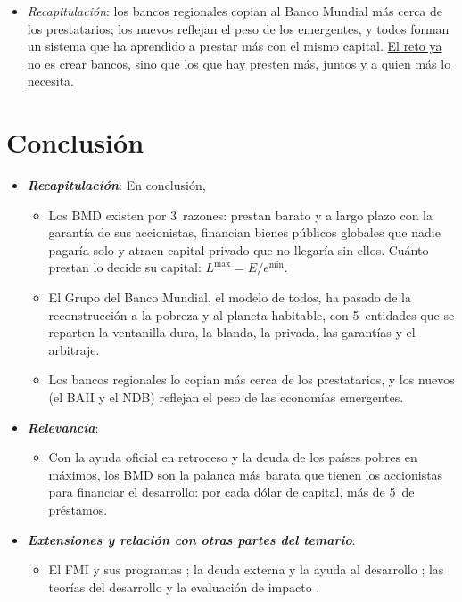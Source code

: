 \documentclass[11pt]{article}
\begin{document}
\begin{itemize}
\item \emph{Recapitulación}: los bancos regionales copian al Banco Mundial más cerca de los prestatarios; los nuevos reflejan el peso de los emergentes, y todos forman un sistema que ha aprendido a prestar más con el mismo capital. \uline{El reto ya no es crear bancos, sino que los que hay presten más, juntos y a quien más lo necesita.}
\end{itemize}

\section*{Conclusión}

\begin{itemize}
\item \textbf{\emph{Recapitulación}}: En conclusión,
  \begin{itemize}
  \item Los BMD existen por 3~razones: prestan barato y a largo plazo con la garantía de sus accionistas, financian bienes públicos globales que nadie pagaría solo y atraen capital privado que no llegaría sin ellos. Cuánto prestan lo decide su capital: $L^{\max}=E/e^{\min}$.
  \item El Grupo del Banco Mundial, el modelo de todos, ha pasado de la reconstrucción a la pobreza y al planeta habitable, con 5~entidades que se reparten la ventanilla dura, la blanda, la privada, las garantías y el arbitraje.
  \item Los bancos regionales lo copian más cerca de los prestatarios, y los nuevos (el BAII y el NDB) reflejan el peso de las economías emergentes.
  \end{itemize}
\item \textbf{\emph{Relevancia}}:
  \begin{itemize}
  \item Con la ayuda oficial en retroceso y la deuda de los países pobres en máximos, los BMD son la palanca más barata que tienen los accionistas para financiar el desarrollo: por cada dólar de capital, más de 5~de préstamos.
  \end{itemize}
\item \textbf{\emph{Extensiones y relación con otras partes del temario}}:
  \begin{itemize}
  \item El FMI y sus programas ; la deuda externa y la ayuda al desarrollo ; las teorías del desarrollo y la evaluación de impacto .

\end{itemize}
\end{itemize}
\end{document}
